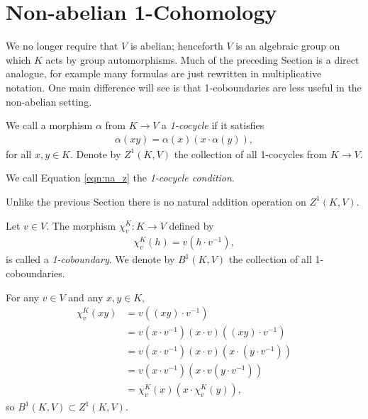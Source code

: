 \section{Non-abelian 1-Cohomology}
	
We no longer require that $V$ is abelian; henceforth $V$ is an algebraic group on which $K$ acts by group automorphisms. Much of the preceding Section is a direct analogue, for example many formulas are just rewritten in multiplicative notation.
One main difference will see is that 1-coboundaries are less useful in the non-abelian setting.

\begin{definition} We call a morphism $\alpha$ from $K\rightarrow V$ a \emph{1-cocycle} if it satisfies
\begin{align}
  \alpha(xy) = \alpha(x) (x\cdot\alpha(y)),
  \label{eqn:na_z}
\end{align}
for all $x, y \in K$. Denote by $Z^1\left( K, V \right)$ the collection of all 1-cocycles from $K\rightarrow V$.

We call Equation \ref{eqn:na_z} the \emph{1-cocycle condition}.
\end{definition}

\begin{remark} Unlike the previous Section there is no natural addition operation on $Z^1(K, V)$.
\end{remark}

\begin{definition} Let $v \in V$. The morphism $\chi^K_v:K\rightarrow V$ defined by
\begin{align*}
	\chi^K_v (h) = v (h\cdot v^{-1}),
\end{align*}
is called a \emph{1-coboundary}. We denote by $B^1\left(K, V\right)$ the collection of all 1-coboundaries.
\end{definition}

For any $v \in V$ and any $x, y \in K$,
\begin{align*}
	\chi^K_v(xy) &=  v \left((xy) \cdot v^{-1}\right) \\
	&=  v (x \cdot v^{-1}) (x \cdot v) ((xy) \cdot v^{-1}) \\
	&=  v \left(x \cdot v^{-1}\right) (x \cdot v) \left(x \cdot \left(y \cdot v^{-1}\right)\right) \\
	&=  v \left(x \cdot v^{-1}\right) \left(x \cdot v \left(y \cdot v^{-1}\right)\right) \\
	&=  \chi^K_v(x) (x \cdot \chi^K_v(y)),
\end{align*}
so $B^1(K, V) \subset Z^1(K, V)$.

